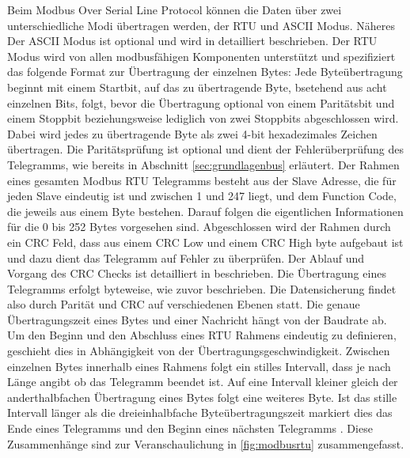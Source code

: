 Beim Modbus Over Serial Line Protocol können die Daten über zwei unterschiedliche Modi übertragen werden, der RTU und ASCII Modus. Näheres Der ASCII Modus ist optional und wird in \cite{mod06ser} detailliert beschrieben. Der RTU Modus wird von allen modbusfähigen Komponenten unterstützt und spezifiziert das folgende Format zur Übertragung der einzelnen Bytes: Jede Byteübertragung beginnt mit einem Startbit, auf das zu übertragende Byte, bsetehend aus acht einzelnen Bits, folgt, bevor die Übertragung optional von einem Paritätsbit und einem Stoppbit beziehungsweise lediglich von zwei Stoppbits abgeschlossen wird. Dabei wird jedes zu übertragende Byte als zwei 4-bit hexadezimales Zeichen übertragen\cite[S.~12f.]{mod06ser}. Die Paritätsprüfung ist optional und dient der Fehlerüberprüfung des Telegramms, wie bereits in Abschnitt \ref{sec:grundlagenbus} erläutert.
Der Rahmen eines gesamten Modbus RTU Telegramms besteht aus der Slave Adresse, die für jeden Slave eindeutig ist und zwischen 1 und 247 liegt, und dem Function Code, die jeweils aus einem Byte bestehen. Darauf folgen die eigentlichen Informationen für die 0 bis 252 Bytes vorgesehen sind. Abgeschlossen wird der Rahmen durch ein CRC Feld, dass aus einem CRC Low und einem CRC High byte aufgebaut ist und dazu dient das Telegramm auf Fehler zu überprüfen. Der Ablauf und Vorgang des CRC Checks ist detailliert in \cite{mod06ser} beschrieben. Die Übertragung eines Telegramms erfolgt byteweise, wie zuvor beschrieben. Die Datensicherung findet also durch Parität und CRC auf verschiedenen Ebenen statt.
Die genaue Übertragungszeit eines Bytes und einer Nachricht hängt von der Baudrate ab. Um den Beginn und den Abschluss eines RTU Rahmens eindeutig zu definieren, geschieht dies in Abhängigkeit von der Übertragungsgeschwindigkeit. Zwischen einzelnen Bytes innerhalb eines Rahmens folgt ein stilles Intervall, dass je nach Länge angibt ob das Telegramm beendet ist. Auf eine Intervall kleiner gleich der anderthalbfachen Übertragung eines Bytes folgt eine weiteres Byte. Ist das stille Intervall länger als die dreieinhalbfache Byteübertragungszeit markiert dies das Ende eines Telegramms und den Beginn eines nächsten Telegramms \cite[S.~13]{mod06ser}. Diese Zusammenhänge sind zur Veranschaulichung in \ref{fig:modbusrtu} zusammengefasst.


